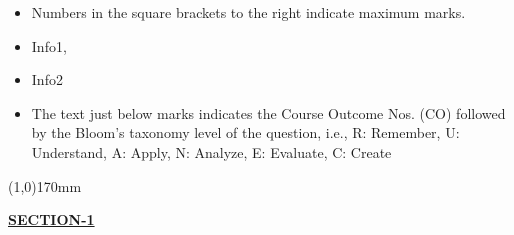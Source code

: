 \documentclass[addpoints,12pt]{exam}
\begin{document}
    \begin{itemize}[leftmargin=4mm,rightmargin=-2cm]
        \item Numbers in the square brackets to the right indicate maximum marks.
       \item Info1,\item Info2
        \item The text just below marks indicates the Course Outcome Nos. (CO) followed by the Bloom’s taxonomy level of the question, i.e., R: Remember, U: Understand, A: Apply, N: Analyze, E: Evaluate, C: Create
    \end{itemize}
    \line(1,0){170mm}
   \vspace{5mm}
\begin{center}
\underline{\textbf{SECTION-1}}\\
\end{center}
\end{document}

